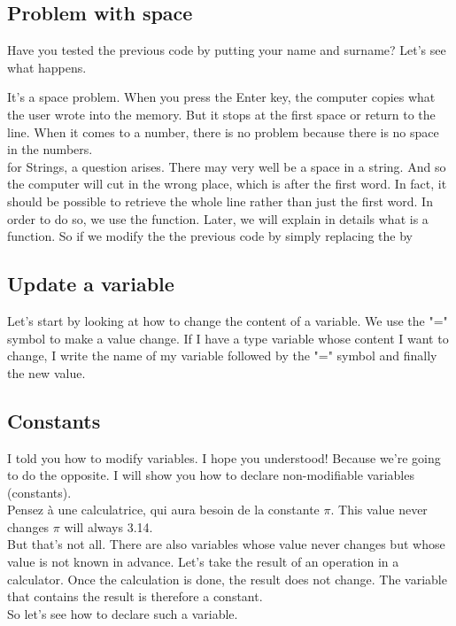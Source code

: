 \documentclass[11pt, a4paper]{article}
\begin{document}
\subsection{Problem with space}
Have you tested the previous code by putting your name and surname?
Let’s see what happens.

It’s a space problem. When you press the Enter key, the computer copies what
the user wrote into the memory. But it stops at the first space or return
to the line. When it comes to a number, there is no problem because there is
no space in the numbers.\\
for Strings, a question arises. There may very well be a space in a string.
And so the computer will cut in the wrong place, which is after the first word.
In fact, it should be possible to retrieve the whole line rather than just the first word.
In order to do so, we use the  function. Later, we will explain in details
what is a function. So if we modify the the previous code by simply replacing the
 by 



\subsection{Update a variable}
Let’s start by looking at how to change the content of a variable.
We use the "=" symbol to make a value change. If I have a type  variable whose
content I want to change, I write the name of my variable followed by
the "=" symbol and finally the new value.


\subsection{Constants}
I told you how to modify variables. I hope you understood! Because
we’re going to do the opposite. I will show you how to declare non-modifiable variables
(constants).\\
Pensez à une calculatrice, qui aura besoin de la constante $\pi$. This value never changes
$\pi$ will always 3.14.\\
But that’s not all. There are also variables whose value never changes but whose value is
not known in advance. Let’s take the result of an operation in a calculator.
Once the calculation is done, the result does not change. The variable that
contains the result is therefore a constant.\\
So let’s see how to declare such a variable.
\end{document}
